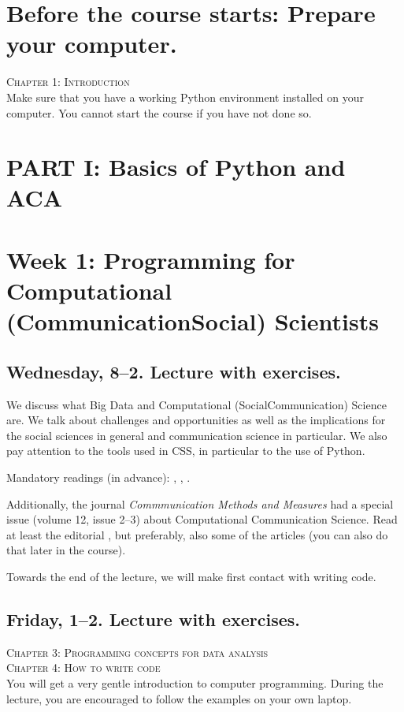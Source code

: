 \section*{Before the course starts: Prepare your computer.}
\textsc{ Chapter 1: Introduction}\\
Make sure that you have a working Python environment installed on your computer. You cannot start the course if you have not done so.

\section*{PART I: Basics of Python and ACA}

\section*{Week 1: Programming for Computational (Communication\textbar Social) Scientists}
\subsection*{Wednesday, 8--2. Lecture with exercises.}
We discuss what Big Data and Computational (Social\textbar Communication) Science are. We talk about challenges and opportunities as well as the implications for the social sciences in general and communication science in particular. We also pay attention to the tools used in CSS, in particular to the use of Python.

Mandatory readings (in advance):  \cite{boyd2012}, \cite{Kitchin2014}, \cite{Hilbert2019}.

Additionally, the journal \textit{Commmunication Methods and Measures} had a special issue (volume 12, issue 2--3) about Computational Communication Science. Read at least the editorial \citep{VanAtteveldt2018a}, but preferably, also some of the articles (you can also do that later in the course).

Towards the end of the lecture, we will make first contact with writing code.


\subsection*{Friday, 1--2. Lecture with exercises.}
\textsc{ Chapter 3: Programming concepts for data analysis}\\
\textsc{ Chapter 4: How to write code}\\

You will get a very gentle introduction to computer programming. During the lecture, you are encouraged to follow the examples on your own laptop.

